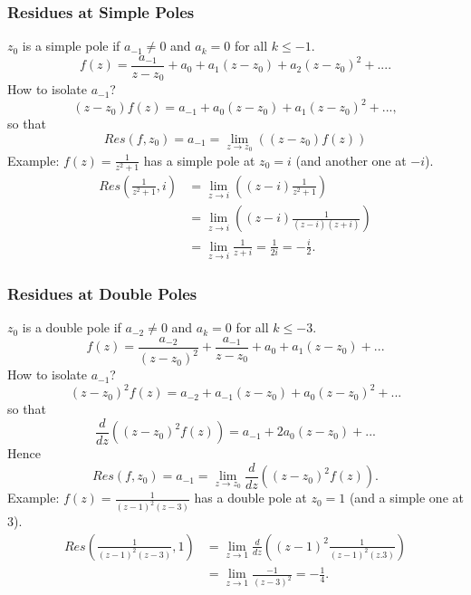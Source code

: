 \documentclass{article}
\begin{document}
\subsubsection{Residues at Simple Poles}
$z_0$ is a simple pole if $a_{-1} \neq 0$ and $a_k = 0$ for all $k \leq -1$.
\begin{equation*}
f(z) = \frac{a_{-1}}{z - z_0} + a_0 + a_1 (z - z_0) + a_2 (z - z_0)^2 + ... .
\end{equation*}
How to isolate $a_{-1}$? 
\begin{equation*}
(z - z_0)f(z) = a_{-1} + a_0(z - z_0) + a_1(z - z_0)^2 + ...,
\end{equation*}
so that
\begin{equation*}
Res(f, z_0) = a_{-1} = \lim_{z \to z_0} ((z - z_0)f(z))
\end{equation*}
Example: $f(z) = \frac{1}{z^2 + 1}$ has a simple pole at $z_0 = i$ (and another one at $-i$).
\begin{align*}
Res(\frac{1}{z^2+1},i) &= \lim_{z \to i}((z-i)\frac{1}{z^2+1}) \\
&= \lim_{z \to i} ((z-i)\frac{1}{(z-i)(z+i)}) \\
&= \lim_{z \to i} \frac{1}{z+i} = \frac{1}{2i} = -\frac{i}{2}.
\end{align*}

\subsubsection{Residues at Double Poles}
$z_0$ is a double pole if $a_{-2} \neq 0$ and $a_k = 0$ for all $k \leq -3$. \\
\begin{equation*}
f(z) = \frac{a_{-2}}{(z - z_0)^2} + \frac{a_{-1}}{z - z_0} + a_0 + a_1(z - z_0) + ...
\end{equation*}
How to isolate $a_{-1}$?
\begin{equation*}
(z-z_0)^2f(z) = a_{-2} + a_{-1}(z-z_0) + a_0(z - z_0)^2+...
\end{equation*}
so that
\begin{equation*}
\frac{d}{dz}((z-z_0)^2f(z)) = a_{-1} + 2a_0(z-z_0)+...
\end{equation*}
Hence
\begin{equation*}
Res(f,z_0) = a_{-1}= \lim_{z \to z_0} \frac{d}{dz}((z-z_0)^2f(z)).
\end{equation*}
Example: $f(z) = \frac{1}{(z-1)^2(z-3)}$ has a double pole at $z_0=1$ (and a simple one at $3$).
\begin{align*}
Res(\frac{1}{(z-1)^2(z-3)},1) &= \lim_{z \to 1} \frac{d}{dz}((z-1)^2 \frac{1}{(z-1)^2(z.3)}) \\
&= \lim_{z \to 1} \frac{-1}{(z-3)^2} = -\frac{1}{4}.
\end{align*}
\end{document}
